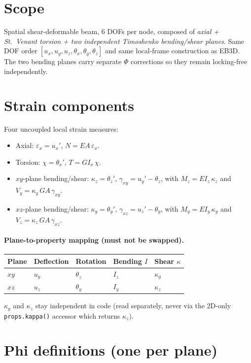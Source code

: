 \documentclass[11pt,a4paper]{book}
\begin{document}
\section{Scope}

Spatial shear-deformable beam, 6 DOFs per node, composed of \emph{axial + St.\ Venant torsion + two independent Timoshenko bending/shear planes}. Same DOF order $[u_x, u_y, u_z, \theta_x, \theta_y, \theta_z]$ and same local-frame construction as EB3D. The two bending planes carry separate $\Phi$ corrections so they remain locking-free independently.

\section{Strain components}

Four uncoupled local strain measures:
\begin{itemize}
    \item Axial: $\varepsilon_x = u_x'$, $N = EA\,\varepsilon_x$.
    \item Torsion: $\chi = \theta_x'$, $T = G I_x\,\chi$.
    \item $xy$-plane bending/shear: $\kappa_z = \theta_z'$, $\gamma_{xy} = u_y' - \theta_z$, with $M_z = E I_z\,\kappa_z$ and $V_y = \kappa_y\,GA\,\gamma_{xy}$.
    \item $xz$-plane bending/shear: $\kappa_y = \theta_y'$, $\gamma_{xz} = u_z' - \theta_y$, with $M_y = E I_y\,\kappa_y$ and $V_z = \kappa_z\,GA\,\gamma_{xz}$.
\end{itemize}

\paragraph{Plane-to-property mapping (must not be swapped).}
\begin{center}
\begin{tabular}{l l l l l}
\toprule
Plane & Deflection & Rotation & Bending $I$ & Shear $\kappa$ \\
\midrule
$xy$ & $u_y$ & $\theta_z$ & $I_z$ & $\kappa_y$ \\
$xz$ & $u_z$ & $\theta_y$ & $I_y$ & $\kappa_z$ \\
\bottomrule
\end{tabular}
\end{center}
$\kappa_y$ and $\kappa_z$ stay independent in code (read separately, never via the 2D-only \texttt{props.kappa()} accessor which returns $\kappa_z$).

\section{Phi definitions (one per plane)}
\end{document}
